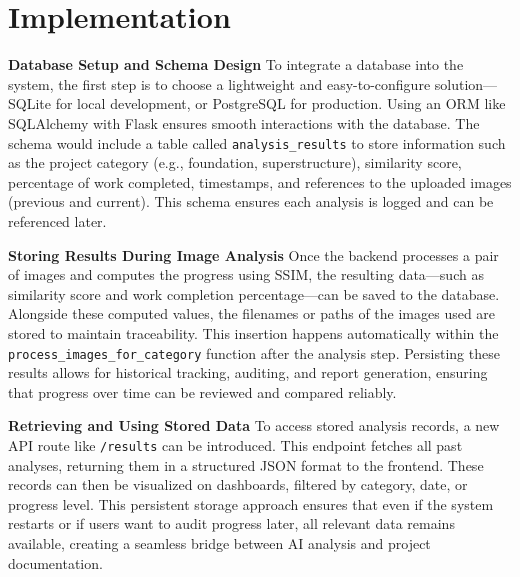 \documentclass[12pt,a4paper]{report}
\begin{document}
\chapter{Implementation}
\label{chap:implementation}

\setlength{\baselineskip}{1.5\baselineskip}

\textbf{Database Setup and Schema Design}
To integrate a database into the system, the first step is to choose a lightweight and easy-to-configure solution—SQLite for local development, or PostgreSQL for production. Using an ORM like SQLAlchemy with Flask ensures smooth interactions with the database. The schema would include a table called \texttt{analysis\_results} to store information such as the project category (e.g., foundation, superstructure), similarity score, percentage of work completed, timestamps, and references to the uploaded images (previous and current). This schema ensures each analysis is logged and can be referenced later.

\textbf{Storing Results During Image Analysis}
Once the backend processes a pair of images and computes the progress using SSIM, the resulting data—such as similarity score and work completion percentage—can be saved to the database. Alongside these computed values, the filenames or paths of the images used are stored to maintain traceability. This insertion happens automatically within the \texttt{process\_images\_for\_category} function after the analysis step. Persisting these results allows for historical tracking, auditing, and report generation, ensuring that progress over time can be reviewed and compared reliably.

\textbf{Retrieving and Using Stored Data}
To access stored analysis records, a new API route like \texttt{/results} can be introduced. This endpoint fetches all past analyses, returning them in a structured JSON format to the frontend. These records can then be visualized on dashboards, filtered by category, date, or progress level. This persistent storage approach ensures that even if the system restarts or if users want to audit progress later, all relevant data remains available, creating a seamless bridge between AI analysis and project documentation.

\setlength{\baselineskip}{1.0\baselineskip}
\end{document}
